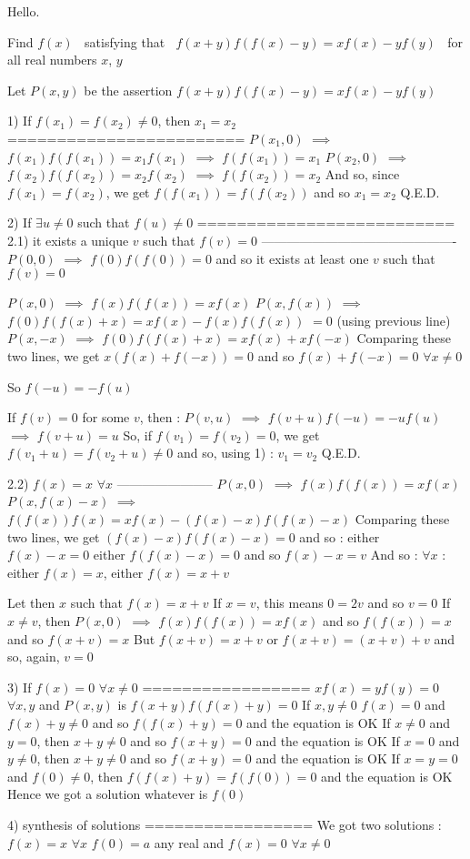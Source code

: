 \begin{solution}
	\begin{tcolorbox}Hello.

Find $f(x)$ $~$ satisfying that $~$ $f(x+y)f( f(x)-y )=xf(x)-yf(y)$ $~$ for all real numbers $x$, $y$\end{tcolorbox}
Let $P(x,y)$ be the assertion $f(x+y)f(f(x)-y)=xf(x)-yf(y)$

1) If $f(x_1)=f(x_2)\ne 0$, then $x_1=x_2$
========================
$P(x_1,0)$ $\implies$ $f(x_1)f(f(x_1))=x_1f(x_1)$ $\implies$ $f(f(x_1))=x_1$
$P(x_2,0)$ $\implies$ $f(x_2)f(f(x_2))=x_2f(x_2)$ $\implies$ $f(f(x_2))=x_2$
And so, since $f(x_1)=f(x_2)$, we get $f(f(x_1))=f(f(x_2))$ and so $x_1=x_2$
Q.E.D.

2) If $\exists u\ne 0$ such that $f(u)\ne 0$
==========================
2.1) it exists a unique $v$ such that $f(v)=0$
----------------------------------------------
$P(0,0)$ $\implies$ $f(0)f(f(0))=0$ and so it exists at least one $v$ such that $f(v)=0$

$P(x,0)$ $\implies$ $f(x)f(f(x))=xf(x)$
$P(x,f(x))$ $\implies$ $f(0)f(f(x)+x)=xf(x)-f(x)f(f(x))$ $=0$ (using previous line)
$P(x,-x)$ $\implies$ $f(0)f(f(x)+x)=xf(x)+xf(-x)$
Comparing these two lines, we get $x(f(x)+f(-x))=0$ and so $f(x)+f(-x)=0$ $\forall x\ne 0$

So $f(-u)=-f(u)$

If $f(v)=0$ for some $v$, then :
$P(v,u)$ $\implies$ $f(v+u)f(-u)=-uf(u)$ $\implies$ $f(v+u)=u$
So, if $f(v_1)=f(v_2)=0$, we get $f(v_1+u)=f(v_2+u)\ne 0$ and so, using 1) : $v_1=v_2$
Q.E.D.

2.2) $f(x)=x$ $\forall x$
-----------------------
$P(x,0)$ $\implies$ $f(x)f(f(x))=xf(x)$
$P(x,f(x)-x)$ $\implies$ $f(f(x))f(x)=xf(x)-(f(x)-x)f(f(x)-x)$
Comparing these two lines, we get $(f(x)-x)f(f(x)-x)=0$ and so :
either $f(x)-x=0$
either $f(f(x)-x)=0$ and so $f(x)-x=v$
And so : $\forall x$ : either $f(x)=x$, either $f(x)=x+v$

Let then $x$ such that $f(x)=x+v$
If $x=v$, this means $0=2v$ and so $v=0$
If $x\ne v$, then $P(x,0)$ $\implies$ $f(x)f(f(x))=xf(x)$ and so $f(f(x))=x$ and so $f(x+v)=x$
But $f(x+v)=x+v$ or $f(x+v)=(x+v)+v$ and so, again, $v=0$

3) If $f(x)=0$ $\forall x\ne 0$
=================
$xf(x)=yf(y)=0$ $\forall x,y$ and $P(x,y)$ is $f(x+y)f(f(x)+y)=0$
If $x,y\ne 0$ $f(x)=0$ and $f(x)+y\ne 0$ and so $f(f(x)+y)=0$ and the equation is OK
If $x\ne 0$ and $y=0$, then $x+y\ne 0$ and so $f(x+y)=0$ and the equation is OK
If $x=0$ and $y\ne 0$, then $x+y\ne 0$ and so $f(x+y)=0$ and the equation is OK
If $x=y=0$ and $f(0)\ne 0$, then $f(f(x)+y)=f(f(0))=0$ and the equation is OK
Hence we got a solution whatever is $f(0)$

4) synthesis of solutions
=================
We got two solutions :
$f(x)=x$ $\forall x$
$f(0)=a$ any real and $f(x)=0$ $\forall x\ne 0$
\end{solution}



